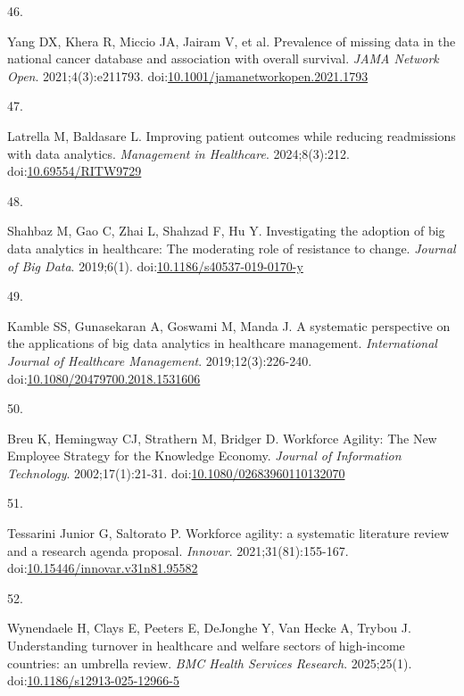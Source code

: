 \documentclass[
  american,
  11pt,
  letterpaper,
  oneside  ,captions=tableheading
]{scrartcl}
\newlength{\cslhangindent}
\newlength{\csllabelwidth}
\newenvironment{CSLReferences}[2] %
 {\begin{list}{}{%
  \setlength{\itemindent}{0pt}
  \setlength{\leftmargin}{0pt}
  \setlength{\parsep}{0pt}
  \ifodd #1
   \setlength{\leftmargin}{\cslhangindent}
   \setlength{\itemindent}{-1\cslhangindent}
  \fi
  \setlength{\itemsep}{#2\baselineskip}}}
 {\end{list}}
\newcommand{\CSLLeftMargin}[1]{\parbox[t]{\csllabelwidth}{\strut#1\strut}}
\newcommand{\CSLRightInline}[1]{\parbox[t]{\linewidth - \csllabelwidth}{\strut#1\strut}}
\begin{document}
\begin{CSLReferences}{0}{1}
\CSLLeftMargin{46. }%
\CSLRightInline{{Yang DX, Khera R, Miccio JA, Jairam V, et al.}
{Prevalence of missing data in the national cancer database and
association with overall survival}. \emph{JAMA Network Open}.
2021;4(3):e211793.
doi:\href{https://doi.org/10.1001/jamanetworkopen.2021.1793}{10.1001/jamanetworkopen.2021.1793}}

\CSLLeftMargin{47. }%
\CSLRightInline{Latrella M, Baldasare L. {Improving patient outcomes
while reducing readmissions with data analytics}. \emph{Management in
Healthcare}. 2024;8(3):212.
doi:\href{https://doi.org/10.69554/RITW9729}{10.69554/RITW9729}}

\CSLLeftMargin{48. }%
\CSLRightInline{Shahbaz M, Gao C, Zhai L, Shahzad F, Hu Y.
{Investigating the adoption of big data analytics in healthcare: The
moderating role of resistance to change}. \emph{Journal of Big Data}.
2019;6(1).
doi:\href{https://doi.org/10.1186/s40537-019-0170-y}{10.1186/s40537-019-0170-y}}

\CSLLeftMargin{49. }%
\CSLRightInline{Kamble SS, Gunasekaran A, Goswami M, Manda J. {A
systematic perspective on the applications of big data analytics in
healthcare management}. \emph{International Journal of Healthcare
Management}. 2019;12(3):226-240.
doi:\href{https://doi.org/10.1080/20479700.2018.1531606}{10.1080/20479700.2018.1531606}}

\CSLLeftMargin{50. }%
\CSLRightInline{Breu K, Hemingway CJ, Strathern M, Bridger D. {Workforce
Agility: The New Employee Strategy for the Knowledge Economy}.
\emph{Journal of Information Technology}. 2002;17(1):21-31.
doi:\href{https://doi.org/10.1080/02683960110132070}{10.1080/02683960110132070}}

\CSLLeftMargin{51. }%
\CSLRightInline{Tessarini Junior G, Saltorato P. {Workforce agility: a
systematic literature review and a research agenda proposal}.
\emph{Innovar}. 2021;31(81):155-167.
doi:\href{https://doi.org/10.15446/innovar.v31n81.95582}{10.15446/innovar.v31n81.95582}}

\CSLLeftMargin{52. }%
\CSLRightInline{Wynendaele H, Clays E, Peeters E, DeJonghe Y, Van Hecke
A, Trybou J. {Understanding turnover in healthcare and welfare sectors
of high-income countries: an umbrella review}. \emph{BMC Health Services
Research}. 2025;25(1).
doi:\href{https://doi.org/10.1186/s12913-025-12966-5}{10.1186/s12913-025-12966-5}}


\end{CSLReferences}
\end{document}
